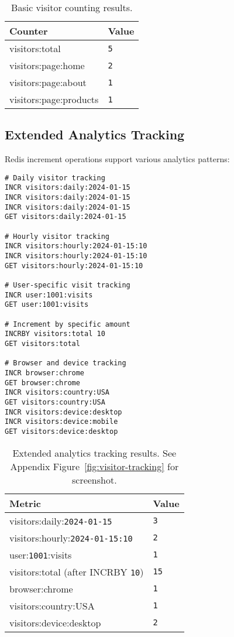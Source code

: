 \begin{table}[H]
  \centering
  \begin{tabular}{|l|l|}
    \hline
    \textbf{Counter} & \textbf{Value} \\
    \hline
    visitors:total & \texttt{5} \\
    visitors:page:home & \texttt{2} \\
    visitors:page:about & \texttt{1} \\
    visitors:page:products & \texttt{1} \\
    \hline
  \end{tabular}
  \caption{Basic visitor counting results.}
\end{table}

\subsection{Extended Analytics Tracking}

Redis increment operations support various analytics patterns:

\begin{verbatim}
# Daily visitor tracking
INCR visitors:daily:2024-01-15
INCR visitors:daily:2024-01-15
INCR visitors:daily:2024-01-15
GET visitors:daily:2024-01-15

# Hourly visitor tracking
INCR visitors:hourly:2024-01-15:10
INCR visitors:hourly:2024-01-15:10
GET visitors:hourly:2024-01-15:10

# User-specific visit tracking
INCR user:1001:visits
GET user:1001:visits

# Increment by specific amount
INCRBY visitors:total 10
GET visitors:total

# Browser and device tracking
INCR browser:chrome
GET browser:chrome
INCR visitors:country:USA
GET visitors:country:USA
INCR visitors:device:desktop
INCR visitors:device:mobile
GET visitors:device:desktop
\end{verbatim}

\begin{table}[H]
  \centering
  \begin{tabular}{|l|l|}
    \hline
    \textbf{Metric} & \textbf{Value} \\
    \hline
    visitors:daily:\texttt{2024-01-15} & \texttt{3} \\
    visitors:hourly:\texttt{2024-01-15:10} & \texttt{2} \\
    user:\texttt{1001}:visits & \texttt{1} \\
    visitors:total (after INCRBY \texttt{10}) & \texttt{15} \\
    browser:chrome & \texttt{1} \\
    visitors:country:USA & \texttt{1} \\
    visitors:device:desktop & \texttt{2} \\
    \hline
  \end{tabular}
  \caption{Extended analytics tracking results. See Appendix Figure~\ref{fig:visitor-tracking} for screenshot.}
\end{table}

